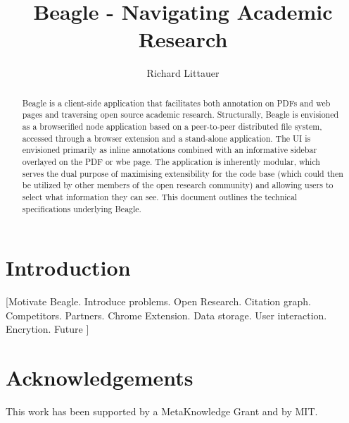 \documentclass{sig-alternate}
\begin{document}
\title{Beagle - Navigating Academic Research}
\subtitle{}


\author{
%
%
\alignauthor
  Richard Littauer\\
}

\maketitle
\begin{abstract}
Beagle is a client-side application that facilitates both annotation on PDFs and web
pages and traversing open source academic research. Structurally, Beagle is
envisioned as a browserified node application based on a peer-to-peer distributed
file system, accessed through a browser extension and a stand-alone application.
The UI is envisioned primarily as inline annotations combined with an informative
sidebar overlayed on the PDF or wbe page. The application is inherently modular,
which serves the dual purpose of maximising extensibility for the code base
(which could then be utilized by other members of the open research community)
and allowing users to select what information they can see. This document outlines
the technical specifications underlying Beagle.
\end{abstract}

\section{Introduction}

[Motivate Beagle. Introduce problems. Open Research. Citation graph. Competitors.
Partners. Chrome Extension. Data storage. User interaction. Encrytion. Future ]

\section{Acknowledgements}

This work has been supported by a MetaKnowledge Grant and by MIT.

%
%
\end{document}
